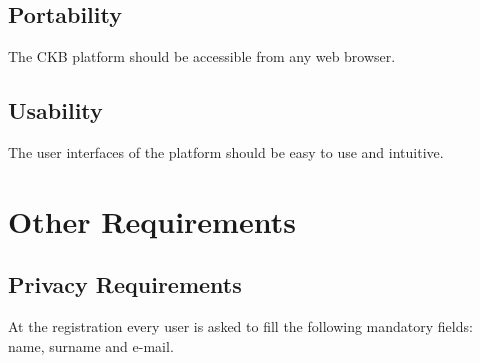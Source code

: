 \subsection{Portability}
The CKB platform should be accessible from any web browser.
\subsection{Usability}
The user interfaces of the platform should be easy to use and intuitive.

\section{Other Requirements}
\subsection{Privacy Requirements}
At the registration every user is asked to fill the following mandatory fields:
name, surname and e-mail. 
